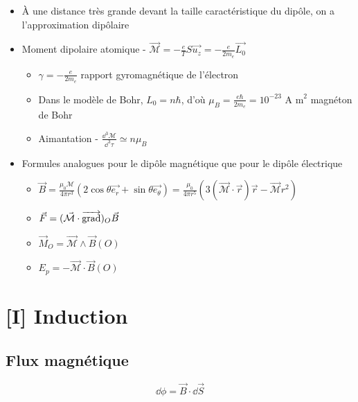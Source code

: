 \documentclass[openany]{book}
\begin{document}
\begin{itemize}
    \item À une distance très grande devant la taille caractéristique du dipôle, on a l'approximation dipôlaire
    \item Moment dipolaire atomique - $\vec{\mathcal{M}} = -\frac{e}{T}S \vec{u_z} = -\frac{e}{2m_e} \vec{L_0}$
    \begin{itemize}
        \item $\gamma = -\frac{e}{2m_e}$ rapport gyromagnétique de l'électron
        \item Dans le modèle de Bohr, $L_0 = n \hbar$, d'où $\mu_B = \frac{e\hbar}{2m_e} = 10^{-23} \text{ A m}^2 $ magnéton de Bohr
        \item Aimantation - $\frac{\dd^3 \mathcal{M}}{\dd^3 \tau} \simeq n \mu_B$
    \end{itemize}
    \item Formules analogues pour le dipôle magnétique que pour le dipôle électrique
    \begin{itemize}
        \item $\vec{B} = \frac{\mu_0 \mathcal{M}}{4 \pi r^3}(2 \cos\theta \vec{e_r} + \sin\theta \vec{e_\theta}) = \frac{\mu_0}{4 \pi r^5} (3(\vec{\mathcal{M}} \cdot \vec{r})\vec{r} - \vec{\mathcal{M}}r^2)$
        \item $\vec{F} = (\vec{\mathcal{M}}\cdot\overrightarrow{{\text{grad}}})_O \vec{B} $
        \item $\vec{M}_O = \vec{\mathcal{M}} \wedge \vec{B}(O)$
        \item $E_p = - \vec{\mathcal{M}} \cdot \vec{B}(O) $
    \end{itemize}
\end{itemize}


\clearpage
\chapter{[I] Induction}

\section{Flux magnétique}
\[ \dd \phi = \vec{B}\cdot \dd \vec{S} \]
\end{document}
